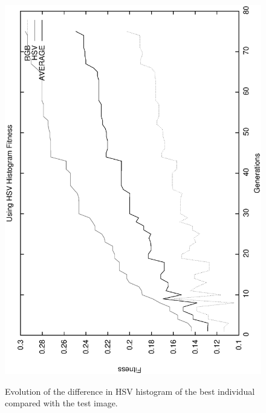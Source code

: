 \documentclass[conference]{IEEEtran}
\begin{document}
\begin{figure}
   \includegraphics[angle=-90,scale =0.35] {images/hsvgens.eps}
\label{fig:hsvgens}
\caption{Evolution of the difference in HSV histogram of the best individual compared with the test image. }
\end{figure}
\end{document}
